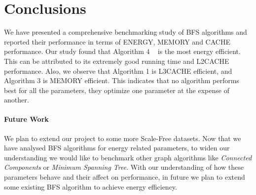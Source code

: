 \section{Conclusions}
\label{conc}

%
%
%

We have presented a comprehensive benchmarking study of BFS algorithms
and reported their performance in terms of ENERGY, MEMORY and CACHE
performance.  Our study found that Algorithm 4 ~\cite{LIGRA-BFS} is the most
energy efficient.  This can be attributed to its extremely good running time 
and L2CACHE performance. 
Also, we observe that Algorithm 1 is L3CACHE efficient, and Algorithm 3 is 
MEMORY efficient.  This indicates that no algorithm performs best for 
all the parameters, they optimize one parameter at the expense of another.


\paragraph{Future Work}
We plan to extend our project to some more Scale-Free datasets.
Now that we have analysed BFS algorithms for energy related
parameters, to widen our understanding we would like to benchmark other
graph algorithms like \emph{Connected Components} or \emph{Minimum
Spanning Tree}.\newline
With our understanding of how these parameters behave and their affect
on performance, in future we plan to extend some existing BFS
algorithm to achieve energy efficiency.

%
%
%
%
%
%
%

